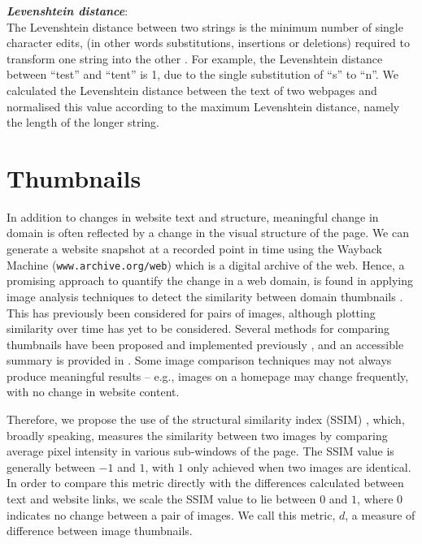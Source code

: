 \documentclass[10pt, a4paper]{article}
\begin{document}
\vspace{1.5mm}
\noindent \textit{\textbf{Levenshtein distance}}:\\
The Levenshtein distance between two strings is the minimum number of single character edits, (in other words substitutions, insertions or deletions) required to transform one string into the other \cite{levenshtein1996}. For example, the Levenshtein distance between ``test'' and ``tent'' is 1, due to the single substitution of ``s'' to ``n''.
We calculated the Levenshtein distance between the text of two webpages and normalised this value according to the maximum Levenshtein distance, namely the length of the longer string. 
\vspace{-3mm}

\section{Thumbnails}
\label{sec:images}
\vspace{-2mm}
In addition to changes in website text and structure, meaningful change in domain is often reflected by a change in the visual structure of the page. We can generate a website snapshot at a recorded point in time using the Wayback Machine (\texttt{www.archive.org/web}) which is a digital archive of the web. Hence, a promising approach to quantify the change in a web domain, is found in applying image analysis techniques to detect the similarity between domain thumbnails \cite{alsum2014thumbnail}. This has previously been considered for pairs of images, although plotting similarity over time has yet to be considered. Several methods for comparing thumbnails have been proposed and implemented previously \cite{henzinger,broder,manku}, and an accessible summary is provided in \cite{alsum2014thumbnail}. Some image comparison techniques may not always produce meaningful results -- e.g., images on a homepage may change frequently, with no change in website content.

Therefore, we propose the use of the structural similarity index (SSIM) \cite{ssim}, which, broadly speaking, measures the similarity between two images by comparing average pixel intensity in various sub-windows of the page. The SSIM value is generally between $-1$ and $1$, with $1$ only achieved when two images are identical. In order to compare this metric directly with the differences calculated between text and website links, we scale the SSIM value to lie between $0$ and $1$, where $0$ indicates no change between a pair of images. We call this metric, $d$, a measure of difference between image thumbnails.
\end{document}
